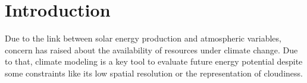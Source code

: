 \begin{abstract}
  

  
  
\end{abstract}

\section{Introduction}


 Due to the link between solar energy production and atmospheric variables, concern has raised about the availability of resources under climate change. Due to that, climate modeling is a key tool to evaluate future energy potential despite some constraints like its low spatial resolution or the representation of cloudiness. 
  

